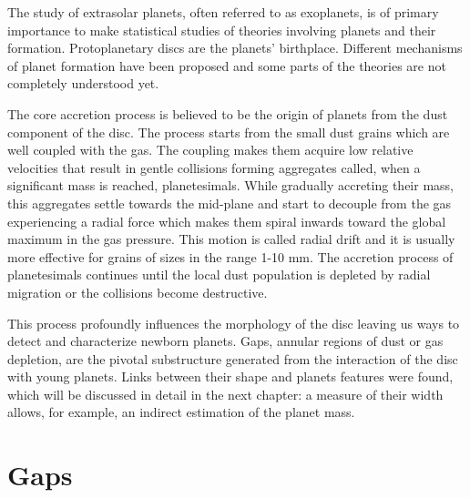 \documentclass[a4paper,10pt]{report}
\begin{document}
The study of extrasolar planets, often referred to as exoplanets, is of primary importance to make statistical studies of theories 
involving planets and their formation. Protoplanetary discs are the planets' birthplace. 
Different mechanisms of planet formation have been proposed and some parts of the theories are not completely
understood yet. 

The core accretion process is believed to be the origin of planets from the dust component of the disc. 
The process starts from the small dust grains which are well coupled with the gas.
The coupling makes them acquire low relative velocities that result in gentle collisions forming aggregates called, when a significant mass is reached, planetesimals.
While gradually accreting their mass, this aggregates settle towards the mid-plane and start to decouple from the gas experiencing a radial force 
which makes them spiral inwards toward the global maximum in the gas pressure. This motion is called radial drift and it is usually more effective for grains of sizes in the range 
1-10 mm.
The accretion process of planetesimals continues until the local dust population is depleted by radial migration or the collisions become destructive.

This process profoundly influences the morphology of the disc leaving us ways to detect and characterize newborn planets. 
Gaps, annular regions of dust or gas depletion, are the pivotal substructure generated from the interaction of the disc with young planets.
Links between their shape and planets features were found, which will be discussed in detail in the next chapter:
a measure of their width allows, for example, an indirect estimation of the planet mass.

\section{Gaps}

\end{document}
